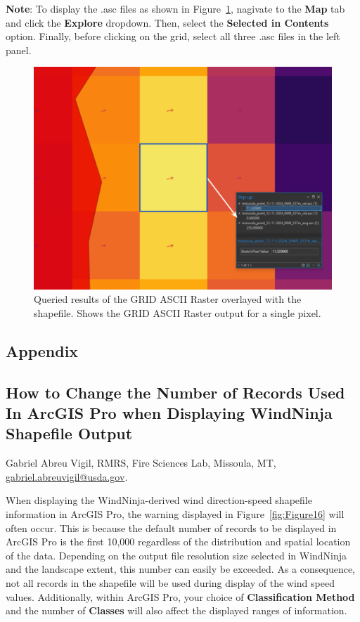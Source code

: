 \documentclass[12pt]{article}
\begin{document}
\textbf{Note}: To display the .asc files as shown in Figure~\ref{fig:Figure15}, nagivate to the \textbf{Map} tab and click the \textbf{Explore} dropdown. Then, select the \textbf{Selected in Contents} option. Finally, before clicking on the grid, select all three .asc files in the left panel. 

\begin{figure}[H]
	\centering
	\includegraphics[scale=0.4]{arc_15.png}
	\caption{Queried results of the GRID ASCII Raster overlayed with the shapefile. Shows the GRID ASCII Raster output for a single pixel.}
\label{fig:Figure15}
\end{figure}


\renewcommand{\thefigure}{\arabic{figure}}
\setcounter{figure}{0}

\pagebreak
\begin{centering}
\section*{Appendix}
\label{section:appendix}

\subsection*{How to Change the Number of Records Used In ArcGIS Pro when Displaying WindNinja Shapefile Output}
Gabriel Abreu Vigil, RMRS, Fire Sciences Lab, Missoula, MT, \href{mailto:gabriel.abreuvigil@usda.gov}{gabriel.abreuvigil@usda.gov}.
\end{centering}

When displaying the WindNinja-derived wind direction-speed shapefile information in ArcGIS Pro, the warning displayed in Figure~\ref{fig:Figure16} will often occur. This is because the default number of records to be displayed in ArcGIS Pro is the first 10,000 regardless of the distribution and spatial location of the data. Depending on the output file resolution size selected in WindNinja and the landscape extent, this number can easily be exceeded. As a consequence, not all records in the shapefile will be used during display of the wind speed values. Additionally, within ArcGIS Pro, your choice of \textbf{Classification Method} and the number of \textbf{Classes} will also affect the displayed ranges of information.
\end{document}
